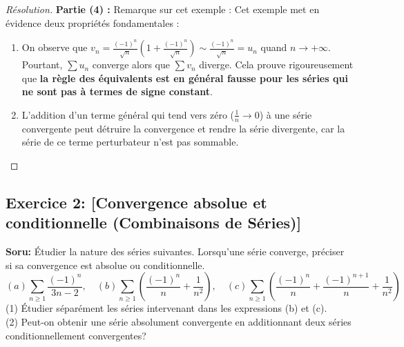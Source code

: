 \documentclass[12pt,a4paper]{report}
\begin{document}
\begin{proof}[Résolution]
\textbf{Partie (4) :} Remarque sur cet exemple :
Cet exemple met en évidence deux propriétés fondamentales :
\begin{enumerate}
    \item On observe que $v_n = \frac{(-1)^n}{\sqrt{n}} \left(1 + \frac{(-1)^n}{\sqrt{n}}\right) \sim \frac{(-1)^n}{\sqrt{n}} = u_n$ quand $n \to +\infty$. Pourtant, $\sum u_n$ converge alors que $\sum v_n$ diverge. Cela prouve rigoureusement que \textbf{la règle des équivalents est en général fausse pour les séries qui ne sont pas à termes de signe constant}.
    \item L'addition d'un terme général qui tend vers zéro ($\frac{1}{n} \to 0$) à une série convergente peut détruire la convergence et rendre la série divergente, car la série de ce terme perturbateur n'est pas sommable.
\end{enumerate}
\end{proof}

\subsection*{Exercice 2: [Convergence absolue et conditionnelle (Combinaisons de Séries)]}

\textbf{Soru:}
Étudier la nature des séries suivantes. Lorsqu'une série converge, préciser si sa convergence est absolue ou conditionnelle.
\[ (a) \sum_{n \ge 1} \frac{(-1)^n}{3n-2}, \quad (b) \sum_{n \ge 1} \left( \frac{(-1)^n}{n} + \frac{1}{n^2} \right), \quad (c) \sum_{n \ge 1} \left( \frac{(-1)^n}{n} + \frac{(-1)^{n+1}}{n} + \frac{1}{n^2} \right) \]
(1) Étudier séparément les séries intervenant dans les expressions (b) et (c).\\
(2) Peut-on obtenir une série absolument convergente en additionnant deux séries conditionnellement convergentes?
\end{document}
